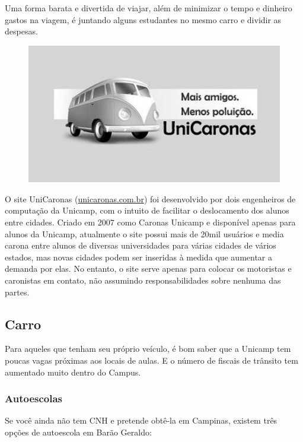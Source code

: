 Uma forma barata e divertida de viajar, além de minimizar o tempo e dinheiro
gastos na viagem, é juntando alguns estudantes no mesmo carro e dividir as
despesas.
\begin{figure}[h!]
    \centering
    \includegraphics[scale=0.55,keepaspectratio=true]{img/imgs/8-transporte/unicaronas.jpg}
\end{figure}

O site UniCaronas (\url{unicaronas.com.br}) foi desenvolvido por dois
engenheiros de computação da Unicamp, com o intuito de facilitar o deslocamento
dos alunos entre cidades. Criado em 2007 como Caronas Unicamp e disponível 
apenas para alunos da Unicamp, atualmente o site possui mais de 20mil usuários 
e media carona entre alunos de diversas universidades para várias cidades de 
vários estados, mas novas cidades podem ser inseridas à medida que aumentar a 
demanda por elas. No entanto, o site serve apenas para colocar os motoristas e 
caronistas em contato, não assumindo responsabilidades sobre nenhuma das partes.

\subsection{Carro}

Para aqueles que tenham seu próprio veículo, é bom saber que a Unicamp tem
poucas vagas próximas aos locais de aulas. E o número de fiscais de trânsito tem
aumentado muito dentro do Campus.

\subsubsection*{Autoescolas}

Se você ainda não tem CNH e pretende obtê-la em Campinas, existem três opções de
autoescola em Barão Geraldo:

